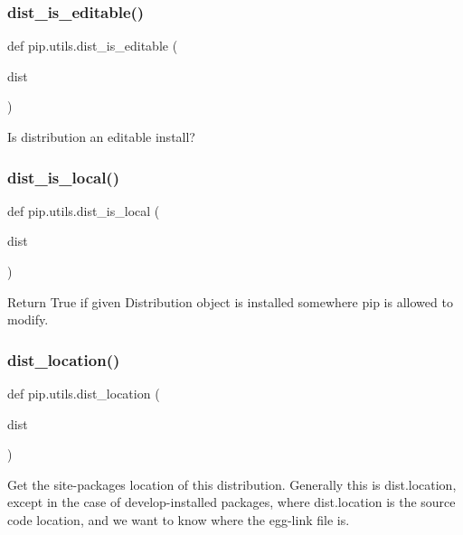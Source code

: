 \subsubsection{\texorpdfstring{dist\+\_\+is\+\_\+editable()}{dist\_is\_editable()}}
{\footnotesize\ttfamily def pip.\+utils.\+dist\+\_\+is\+\_\+editable (\begin{DoxyParamCaption}\item[{}]{dist }\end{DoxyParamCaption})}

\begin{DoxyVerb}Is distribution an editable install?\end{DoxyVerb}
 \mbox{\label{namespacepip_1_1utils_a351b073e578787c7fbb84c776478d256}} 
\subsubsection{\texorpdfstring{dist\+\_\+is\+\_\+local()}{dist\_is\_local()}}
{\footnotesize\ttfamily def pip.\+utils.\+dist\+\_\+is\+\_\+local (\begin{DoxyParamCaption}\item[{}]{dist }\end{DoxyParamCaption})}

\begin{DoxyVerb}Return True if given Distribution object is installed somewhere pip
is allowed to modify.\end{DoxyVerb}
 \mbox{\label{namespacepip_1_1utils_aec8195a6a4a7b4bdbe335de31a28b39c}} 
\subsubsection{\texorpdfstring{dist\+\_\+location()}{dist\_location()}}
{\footnotesize\ttfamily def pip.\+utils.\+dist\+\_\+location (\begin{DoxyParamCaption}\item[{}]{dist }\end{DoxyParamCaption})}

\begin{DoxyVerb}Get the site-packages location of this distribution. Generally
this is dist.location, except in the case of develop-installed
packages, where dist.location is the source code location, and we
want to know where the egg-link file is.\end{DoxyVerb}
 \mbox{\label{namespacepip_1_1utils_a8024e48cf0ad54a8b596d7ce9c650406}} 

